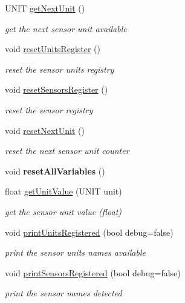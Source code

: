 \begin{DoxyCompactItemize}
U\+N\+IT \hyperlink{classSensors_ad33c76f341c86ac1900c5953fca9c0d1}{get\+Next\+Unit} ()
\begin{DoxyCompactList}\small\item\em get the next sensor unit available \end{DoxyCompactList}\item 
void \hyperlink{classSensors_a47635ad00b96b1175c96c6ead2c4a514}{reset\+Units\+Register} ()
\begin{DoxyCompactList}\small\item\em reset the sensor units registry \end{DoxyCompactList}\item 
void \hyperlink{classSensors_a86190ba0e2fce178aaf936d2c926f7fe}{reset\+Sensors\+Register} ()
\begin{DoxyCompactList}\small\item\em reset the sensor registry \end{DoxyCompactList}\item 
void \hyperlink{classSensors_ae6ac6080b6ad79ba9cd441646826058d}{reset\+Next\+Unit} ()
\begin{DoxyCompactList}\small\item\em reset the next sensor unit counter \end{DoxyCompactList}\item 
\mbox{\label{classSensors_a296d40a89de2b405c19f1982d6083545}} 
void {\bfseries reset\+All\+Variables} ()
\item 
float \hyperlink{classSensors_a7e75dd4e3f2e655a9961f57650cbf749}{get\+Unit\+Value} (U\+N\+IT unit)
\begin{DoxyCompactList}\small\item\em get the sensor unit value (float) \end{DoxyCompactList}\item 
void \hyperlink{classSensors_a0e9516d728256efd1eba97ef834cd385}{print\+Units\+Registered} (bool debug=false)
\begin{DoxyCompactList}\small\item\em print the sensor units names available \end{DoxyCompactList}\item 
void \hyperlink{classSensors_aed05af978baed0801ff4de5f1c367cf0}{print\+Sensors\+Registered} (bool debug=false)
\begin{DoxyCompactList}\small\item\em print the sensor names detected \end{DoxyCompactList}\end{DoxyCompactItemize}
